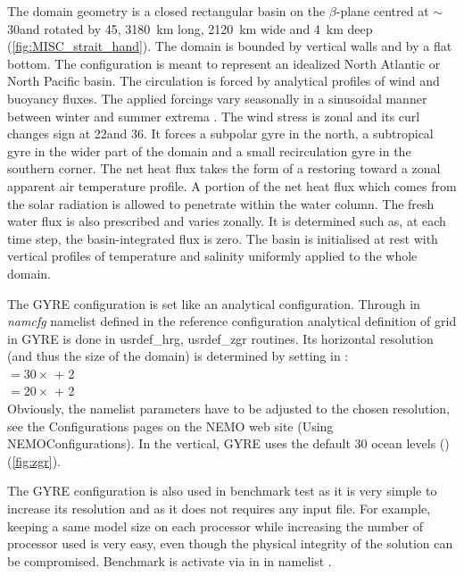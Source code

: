\documentclass[../main/NEMO_manual]{subfiles}
\begin{document}
The domain geometry is a closed rectangular basin on the $\beta$-plane centred at $\sim$ 30\degN and
rotated by 45\deg, 3180~km long, 2120~km wide and 4~km deep (\autoref{fig:MISC_strait_hand}).
The domain is bounded by vertical walls and by a flat bottom.
The configuration is meant to represent an idealized North Atlantic or North Pacific basin.
The circulation is forced by analytical profiles of wind and buoyancy fluxes.
The applied forcings vary seasonally in a sinusoidal manner between winter and summer extrema \citep{Levy_al_OM10}. 
The wind stress is zonal and its curl changes sign at 22\degN and 36\degN.
It forces a subpolar gyre in the north, a subtropical gyre in the wider part of the domain and
a small recirculation gyre in the southern corner.
The net heat flux takes the form of a restoring toward a zonal apparent air temperature profile.
A portion of the net heat flux which comes from the solar radiation is allowed to penetrate within the water column.
The fresh water flux is also prescribed and varies zonally.
It is determined such as, at each time step, the basin-integrated flux is zero.
The basin is initialised at rest with vertical profiles of temperature and salinity uniformly applied to
the whole domain.

The GYRE configuration is set like an analytical configuration.
Through  in \textit{namcfg} namelist defined in
the reference configuration 
analytical definition of grid in GYRE is done in usrdef\_hrg, usrdef\_zgr routines.
Its horizontal resolution (and thus the size of the domain) is determined by
setting  in : \\
 $= 30 \times$  + 2   \\
 $= 20 \times$  + 2   \\
Obviously, the namelist parameters have to be adjusted to the chosen resolution,
see the Configurations pages on the NEMO web site (Using NEMO\/Configurations).
In the vertical, GYRE uses the default 30 ocean levels () (\autoref{fig:zgr}).

The GYRE configuration is also used in benchmark test as it is very simple to increase its resolution and
as it does not requires any input file.
For example, keeping a same model size on each processor while increasing the number of processor used is very easy,
even though the physical integrity of the solution can be compromised.
Benchmark is activate via  in  in
namelist .
\end{document}
